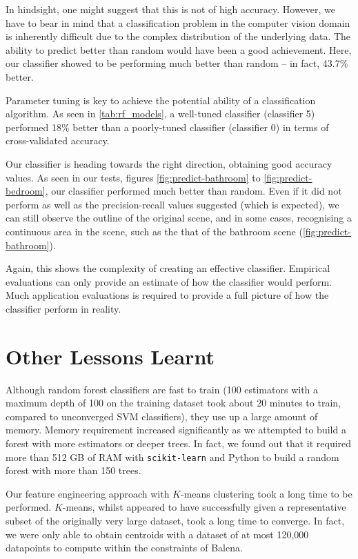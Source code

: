 In hindsight, one might suggest that this is not of high accuracy. However, we have to bear in mind that a classification problem in the computer vision domain is inherently difficult due to the complex distribution of the underlying data. The ability to predict better than random would have been a good achievement. Here, our classifier showed to be performing much better than random -- in fact, 43.7\% better. 

Parameter tuning is key to achieve the potential ability of a classification algorithm. As seen in \autoref{tab:rf_models}, a well-tuned classifier (classifier 5) performed 18\% better than a poorly-tuned classifier (classifier 0) in terms of cross-validated accuracy.

Our classifier is heading towards the right direction, obtaining good accuracy values. As seen in our tests, figures \ref{fig:predict-bathroom} to \ref{fig:predict-bedroom}, our classifier performed much better than random. Even if it did not perform as well as the precision-recall values suggested (which is expected), we can still observe the outline of the original scene, and in some cases, recognising a continuous area in the scene, such as the that of the bathroom scene (\autoref{fig:predict-bathroom}).

Again, this shows the complexity of creating an effective classifier. Empirical evaluations can only provide an estimate of how the classifier would perform. Much application evaluations is required to provide a full picture of how the classifier perform in reality. 


\newpage
\section{Other Lessons Learnt} \label{sec:conc-lessons}
Although random forest classifiers are fast to train (100 estimators with a maximum depth of 100 on the training dataset took about 20 minutes to train, compared to unconverged SVM classifiers), they use up a large amount of memory. Memory requirement increased significantly as we attempted to build a forest with more estimators or deeper trees. In fact, we found out that it required more than 512 GB of RAM with \texttt{scikit-learn} and Python to build a random forest with more than 150 trees. 

Our feature engineering approach with $K$-means clustering took a long time to be performed. $K$-means, whilst appeared to have successfully given a representative subset of the originally very large dataset, took a long time to converge. In fact, we were only able to obtain centroids with a dataset of at most 120,000 datapoints to compute within the constraints of Balena. 

